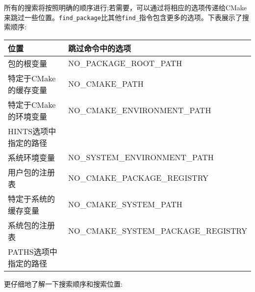 所有的搜索将按照明确的顺序进行;若需要，可以通过将相应的选项传递给CMake来跳过一些位置。\texttt{find\_package}比其他\texttt{find\_}指令包含更多的选项。下表展示了搜索顺序:

\begin{table}[H]
	\centering
	\begin{tabular}{|l|l|}
		\hline
		\textbf{位置}                     & \textbf{跳过命令中的选项}  \\ \hline
		包的根变量                & NO\_PACKAGE\_ROOT\_PATH              \\ \hline
		特定于CMake的缓存变量        & NO\_CMAKE\_PATH                      \\ \hline
		特定于CMake的环境变量  & NO\_CMAKE\_ENVIRONMENT\_PATH         \\ \hline
		HINTS选项中指定的路径  &                                      \\ \hline
		系统环境变量 & NO\_SYSTEM\_ENVIRONMENT\_PATH        \\ \hline
		用户包的注册表                 & NO\_CMAKE\_PACKAGE\_REGISTRY         \\ \hline
		特定于系统的缓存变量       & NO\_CMAKE\_SYSTEM\_PATH              \\ \hline
		系统包的注册表               & NO\_CMAKE\_SYSTEM\_PACKAGE\_REGISTRY \\ \hline
		PATHS选项中指定的路径   &                                      \\ \hline
	\end{tabular}
\end{table}

更仔细地了解一下搜索顺序和搜索位置:

